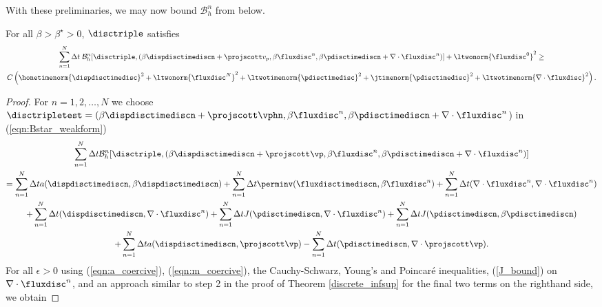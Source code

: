 With these preliminaries, we may now bound $\mathcal{B}_{h}^{n}$ from below.
\begin{lemma}
\label{lemma_bstar}
For all  $\beta > \beta^{\star} > 0$,   $\disctriple$ satisfies
\begin{multline*}
  \sum_{n=1}^{N} \Delta t \; \mathcal{B}_{h}^{n}[\disctriple, ( \beta \dispdisctimediscn + \projscott v_{p} ,  \beta \fluxdisc^{n}, \beta\pdisctimediscn    + \nabla \cdot \fluxdisc^{n} )] + \ltwonorm{\fluxdisc^{0}}^{2} \geq \\ C\left( \honetimenorm{\dispdisctimedisc}^{2}+ \ltwonorm{\fluxdisc^{N}}^{2}+ \ltwotimenorm{ \pdisctimedisc}^{2}+ \jtimenorm{ \pdisctimedisc}^{2} +\ltwotimenorm{\nabla \cdot \fluxdisc}^{2}  \right).
\end{multline*}
\end{lemma}
\begin{proof}

For $n = 1,2, \ldots , N$ we choose $\disctripletest = (\beta \dispdisctimediscn + \projscott \vphn,   \beta \fluxdisc^{n},   \beta \pdisctimediscn + \nabla \cdot \fluxdisc^{n} $) in (\ref{eqn:Bstar_weakform})
\begin{multline}
\sum_{n=1}^{N} \Delta t  \mathcal{B}_{h}^{n}[\disctriple, ( \beta \dispdisctimediscn + \projscott \vp  ,  \beta \fluxdisc^{n}, \beta\pdisctimediscn   + \nabla \cdot \fluxdisc^{n}  )] \\
=\sum^{N}_{n=1} \Delta t a(\dispdisctimediscn,\beta \dispdisctimediscn)
+ \sum^{N}_{n=1} \Delta t \perminv(\fluxdisctimediscn,  \beta\fluxdisc^{n})
+ \sum^{N}_{n=1} \Delta t (\nabla \cdot \fluxdisc^{n}, \nabla \cdot \fluxdisc^{n}) \\
+ \sum^{N}_{n=1} \Delta t( \dispdisctimediscn , \nabla \cdot \fluxdisc^{n})
+ \sum^{N}_{n=1} \Delta tJ( \pdisctimediscn ,\nabla \cdot \fluxdisc^{n} )
+ \sum^{N}_{n=1} \Delta tJ( \pdisctimediscn , \beta\pdisctimediscn) \\
+ \sum^{N}_{n=1} \Delta t a(\dispdisctimediscn,\projscott \vp)
- \sum^{N}_{n=1} \Delta t (\pdisctimediscn,\nabla \cdot \projscott \vp).
\label{eqn:sum_Bstar}
\end{multline}
For all $\epsilon > 0$ using  (\ref{eqn:a_coercive}), (\ref{eqn:m_coercive}), the Cauchy-Schwarz, Young's and  Poincar\'{e} inequalities, (\ref{J_bound}) on $ \nabla \cdot \fluxdisc^{n}$, and an approach similar to step 2 in the proof of Theorem \ref{discrete_infsup} for the final two terms on the righthand side, we obtain


\end{proof}
